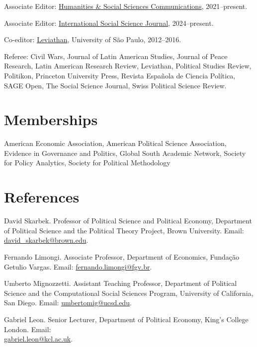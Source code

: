 \documentclass[a4paper]{article}
\renewenvironment{itemize}{
	\begin{list}{}{
			\setlength{\leftmargin}{1.5em}
		}
		}{
	\end{list}
}
\begin{document}
\begin{itemize}
\item Associate Editor: \href{https://www.nature.com/palcomms/}{Humanities \& Social Sciences Communications}, 2021--present.
\item Associate Editor: \href{https://onlinelibrary.wiley.com/journal/14682451}{International Social Science Journal}, 2024--present.
\item Co-editor: \href{https://www.revistas.usp.br/leviathan}{Leviathan}, University of São Paulo, 2012--2016.
\item Referee: Civil Wars, Journal of Latin American Studies, Journal of Peace Research, Latin American Research Review, Leviathan, Political Studies Review, Politikon, Princeton University Press, Revista Española de Ciencia Política, SAGE Open, The Social Science Journal, Swiss Political Science Review.
\end{itemize}

\section*{Memberships}

\begin{itemize}
\item American Economic Association, American Political Science Association, Evidence in Governance and Politics, Global South Academic Network, Society for Policy Analytics, Society for Political Methodology
\end{itemize}

\section*{References}

\begin{itemize}

\item David Skarbek. Professor of Political Science and Political Economy, Department of Political Science and the Political Theory Project, Brown University. Email: \href{mailto:davidskarbek@gmail.com}{david\_skarbek@brown.edu}.
\item Fernando Limongi. Associate Professor, Department of Economics, Fundação Getulio Vargas. Email: \href{mailto:fernando.limongi@fgv.br}{fernando.limongi@fgv.br}.
\item Umberto Mignozzetti. Assistant Teaching Professor, Department of Political Science and the Computational Social Sciences Program, University of California, San Diego. Email: \href{mailto:umbertomig@ucsd.edu}{umbertomig@ucsd.edu}.
\item Gabriel Leon. Senior Lecturer, Department of Political Economy, King's College London. Email: \\ \href{mailto:gabriel.leon@kcl.ac.uk}{gabriel.leon@kcl.ac.uk}.
\end{itemize}

	\bigskip
\end{document}
